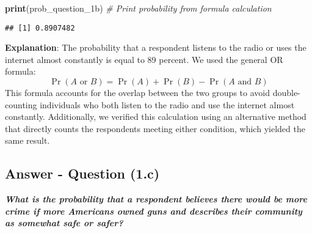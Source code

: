 \documentclass[
  11pt,
]{article}
\newenvironment{Shaded}{\begin{snugshade}}{\end{snugshade}}
\newcommand{\CommentTok}[1]{\textcolor[rgb]{0.56,0.35,0.01}{\textit{#1}}}
\newcommand{\FunctionTok}[1]{\textcolor[rgb]{0.13,0.29,0.53}{\textbf{#1}}}
\newcommand{\NormalTok}[1]{#1}
\begin{document}
\begin{Shaded}
\begin{Highlighting}[]
\FunctionTok{print}\NormalTok{(prob\_question\_1b)  }\CommentTok{\# Print probability from formula calculation}
\end{Highlighting}
\end{Shaded}

\begin{verbatim}
## [1] 0.8907482
\end{verbatim}

\textbf{Explanation}: The probability that a respondent listens to the
radio or uses the internet almost constantly is equal to 89 percent. We
used the general OR formula:
\[\Pr(A\text{ or }B) = \Pr(A) + \Pr(B) - \Pr(A\text{ and }B)\] This
formula accounts for the overlap between the two groups to avoid
double-counting individuals who both listen to the radio and use the
internet almost constantly. Additionally, we verified this calculation
using an alternative method that directly counts the respondents meeting
either condition, which yielded the same result.

\subsection{Answer - Question (1.c)}\label{answer---question-1.c}

\textbf{\emph{What is the probability that a respondent believes there
would be more crime if more Americans owned guns and describes their
community as somewhat safe or safer?}}
\end{document}
